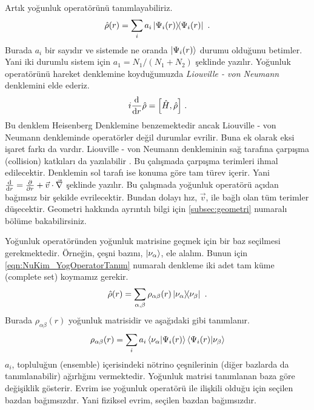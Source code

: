 Artık yoğunluk operatörünü tanımlayabiliriz.
\begin{equation} \label{eqn:NuKim_YogOperatorTanım}
	\hat{\rho} (r) = \sum_{i} a_{i} \dyad{\Psi_{i}(r)}{\Psi_{i}(r)}  \text{ .}
\end{equation}
Burada $ a_{i} $ bir sayıdır ve sistemde ne oranda $ \ket{\Psi_{i}(r)} $ durumu olduğunu betimler. Yani iki durumlu sistem için $ a_{1}=N_{1}/(N_{1}+N_{2}) $ şeklinde yazılır. Yoğunluk operatörünü hareket denklemine koyduğumuzda \emph{Liouville - von Neumann} denklemini elde ederiz. 
\begin{equation}\label{eqn:NuKim_LiouvilleVonNeumann}
	i \dv{r} \hat{\rho} = \comm{\hat{H}}{\hat{\rho}} \text{ .}
\end{equation}
Bu denklem Heisenberg Denklemine benzemektedir ancak Liouville - von Neumann denkleminde operatörler değil durumlar evrilir. Buna ek olarak eksi işaret farkı da vardır. Liouville - von Neumann denkleminin sağ tarafına çarpışma (collision) katkıları da yazılabilir \cite{Volpe:2015rla}. Bu çalışmada çarpışma terimleri ihmal edilecektir. Denklemin sol tarafı ise konuma göre tam türev içerir. Yani $ \dv{r} = \pdv{r} + \vec{v} \cdot \vec{\nabla} $ şeklinde yazılır. Bu çalışmada yoğunluk operatörü açıdan bağımsız bir şekilde evrilecektir. Bundan dolayı hız, $ \vec{v} $, ile bağlı olan tüm terimler düşecektir. Geometri hakkında ayrıntılı bilgi için \ref{subsec:geometri} numaralı bölüme bakabilirsiniz.

Yoğunluk operatöründen yoğunluk matrisine geçmek için bir baz seçilmesi gerekmektedir. Örneğin, çeşni bazını, $ \ket{\nu_{\alpha}} $, ele alalım. Bunun için \eqref{eqn:NuKim_YogOperatorTanım} numaralı denkleme iki adet tam küme (complete set) koymamız gerekir.
\begin{equation}
	\hat{\rho}(r) = \sum_{\alpha,\beta} \rho_{\alpha\beta}(r) \dyad{\nu_{\alpha}}{\nu_{\beta}} \text{ .}
\end{equation}
Burada $ \rho_{\alpha\beta}(r) $ yoğunluk matrisidir ve aşağıdaki gibi tanımlanır.
\begin{equation}
	\rho_{\alpha\beta}(r) = \sum_{i} a_{i}\braket{\nu_{\alpha}}{\Psi_{i}(r)}\braket{\Psi_{i}(r)}{\nu_{\beta}}
\end{equation}
$ a_{i} $, topluluğun (ensemble) içerisindeki nötrino çeşnilerinin (diğer bazlarda da tanımlanabilir) ağırlığını vermektedir. Yoğunluk matrisi tanımlanan baza göre değişiklik gösterir. Evrim ise yoğunluk operatörü ile ilişkili olduğu için seçilen bazdan bağımsızdır. Yani fiziksel evrim, seçilen bazdan bağımsızdır.


